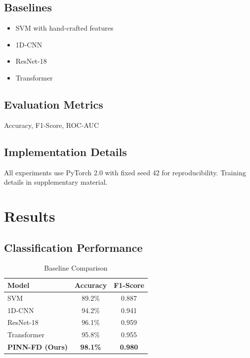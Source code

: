 \documentclass[journal]{IEEEtran}
\newcommand{\modelname}{PINN-FD}
\begin{document}
\subsection{Baselines}

\begin{itemize}
    \item SVM with hand-crafted features
    \item 1D-CNN
    \item ResNet-18
    \item Transformer
\end{itemize}

\subsection{Evaluation Metrics}

Accuracy, F1-Score, ROC-AUC

\subsection{Implementation Details}

All experiments use PyTorch 2.0 with fixed seed 42 for reproducibility.
Training details in supplementary material.

\section{Results}
\label{sec:results}

\subsection{Classification Performance}

\begin{table}[h]
\centering
\caption{Baseline Comparison}
\label{tab:baseline}
\begin{tabular}{lcc}
\toprule
\textbf{Model} & \textbf{Accuracy} & \textbf{F1-Score} \\
\midrule
SVM & 89.2\% & 0.887 \\
1D-CNN & 94.2\% & 0.941 \\
ResNet-18 & 96.1\% & 0.959 \\
Transformer & 95.8\% & 0.955 \\
\textbf{\modelname{} (Ours)} & \textbf{98.1\%} & \textbf{0.980} \\
\bottomrule
\end{tabular}
\end{table}
\end{document}
